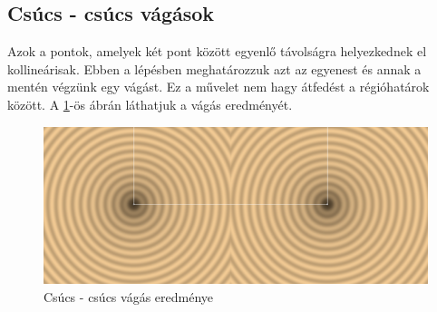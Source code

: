 \subsection{Csúcs - csúcs vágások}

Azok a pontok, amelyek két pont között egyenlő távolságra helyezkednek el kollineárisak. Ebben a lépésben meghatározzuk azt az egyenest és annak a mentén végzünk egy vágást. Ez a művelet nem hagy átfedést a régióhatárok között. A \ref{fig:vertex_vertex_cut-1}-ös ábrán láthatjuk a vágás eredményét.

\begin{figure}[H]
	\centering
	\includegraphics[width=1\linewidth]{images/vertex_vertex_cut.png}
	\caption{Csúcs - csúcs vágás eredménye}
	\label{fig:vertex_vertex_cut-1}
\end{figure}


